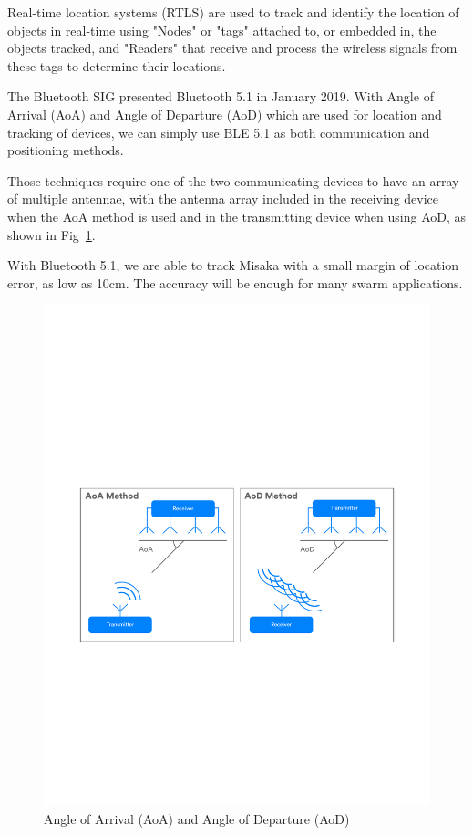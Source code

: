 \documentclass[sigconf]{acmart}
\begin{document}
Real-time location systems (RTLS) are used to track and identify the location of objects in real-time using "Nodes" or "tags" attached to, or embedded in, the objects tracked, and "Readers" that receive and process the wireless signals from these tags to determine their locations.\cite{costs2009real}

The Bluetooth SIG presented Bluetooth 5.1 in January 2019. With Angle of Arrival (AoA) and Angle of Departure (AoD) which are used for location and tracking of devices, we can simply use BLE 5.1 as both communication and positioning methods.

Those techniques require one of the two communicating devices to have an array of multiple antennae, with the antenna array included in the receiving device when the AoA method is used and in the transmitting device when using AoD, as shown in Fig~\ref{fig:AODAOE}.\cite{woolley2019bluetooth}

With Bluetooth 5.1, we are able to track Misaka with a small margin of location error, as low as 10cm. The accuracy will be enough for many swarm applications.

\begin{figure}[h]
  \centering
  \includegraphics[width=\linewidth]{AODAOE.pdf}
  \caption{Angle of Arrival (AoA) and Angle of Departure (AoD)}
  \label{fig:AODAOE}
\end{figure}
\end{document}
